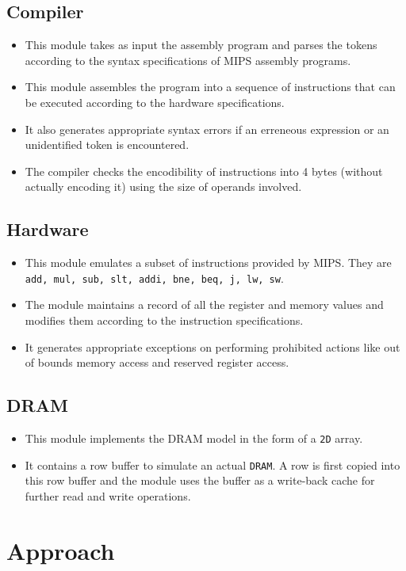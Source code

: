 \documentclass[hidelinks,12pt]{article}
\begin{document}
\subsection{Compiler}
\begin{itemize}
    \item This module takes as input the assembly program and parses the tokens according to the syntax specifications of MIPS assembly programs.
    \item This module assembles the program into a sequence of instructions that can be executed according to the hardware specifications.
    \item It also generates appropriate syntax errors if an erreneous expression or an unidentified token is encountered.
    \item The compiler checks the encodibility of instructions into 4 bytes (without actually encoding it) using the size of operands involved.
\end{itemize}
\subsection{Hardware}
\begin{itemize}
    \item This module emulates a subset of instructions provided by MIPS. They are \verb|add, mul, sub, slt, addi, bne, beq, j, lw, sw|.
    \item The module maintains a record of all the register and memory values and modifies them according to the instruction specifications.
    \item It generates appropriate exceptions on performing prohibited actions like out of bounds memory access and reserved register access.
\end{itemize}

\subsection{DRAM}
\begin{itemize}
    \item This module implements the DRAM model in the form of a \verb|2D| array.
    \item It contains a row buffer to simulate an actual \verb|DRAM|. A row is first copied into this row buffer and the module uses the buffer as a write-back cache for further read and write operations.
\end{itemize}

\section{Approach}
\end{document}
